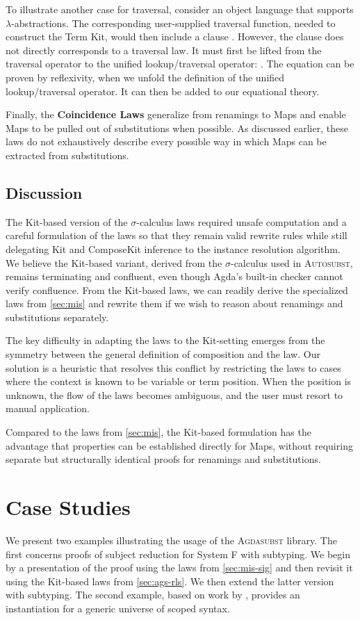 \documentclass[screen,nonacm]{acmart}
\begin{document}
To illustrate another case for traversal, consider an object language that
supports $λ$-abstractions. The corresponding user-supplied traversal function,
needed to construct the Term Kit, would then include a clause \FSLambdaExT.
However, the clause does not directly corresponds to a traversal law. It must
first be lifted from the traversal operator to the unified lookup/traversal
operator: \FSLambdaExL. The equation can be proven by reflexivity, when we
unfold the definition of the unified lookup/traversal operator. It can then be
added to our equational theory.

Finally, the \textbf{Coincidence Laws} generalize from renamings to Maps and
enable Maps to be pulled out of substitutions when possible. As discussed
earlier, these laws do not exhaustively describe every possible way in which
Maps can be extracted from substitutions.

\subsection{Discussion}
The Kit-based version of the $σ$-calculus laws required unsafe computation and
a careful formulation of the laws so that they remain valid rewrite rules while
still delegating Kit and ComposeKit inference to the instance resolution
algorithm. We believe the Kit-based variant, derived from the $σ$-calculus used
in \textsc{Autosubst}, remains terminating and confluent, even though Agda’s
built-in checker cannot verify confluence. From the Kit-based laws, we can
readily derive the specialized laws from \cref{sec:mis} and rewrite them if we
wish to reason about renamings and substitutions separately.

The key difficulty in adapting the laws to the Kit-setting emerges from the
symmetry between the general definition of composition  and
the  law. Our solution is a heuristic that resolves
this conflict by restricting the laws to cases where the context is known to be
variable or term position. When the position is unknown, the flow of the laws
becomes ambiguous, and the user must resort to manual application.

Compared to the laws from \cref{sec:mis}, the Kit-based formulation has the
advantage that properties can be established directly for Maps, without
requiring separate but structurally identical proofs for renamings and
substitutions.

\section{Case Studies}\label{sec:ext}
We present two examples illustrating the usage of the \textsc{Agdasubst}
library. The first concerns proofs of subject reduction for System F with
subtyping. We begin by a presentation of the proof using the laws from
\cref{sec:mis-sig} and then revisit it using the Kit-based laws from
\cref{sec:ags-rls}. We then extend the latter version with subtyping. The
second example, based on work by \citet{allais2021typescopesafeuniverse},
provides an instantiation for a generic universe of scoped syntax.
\end{document}
